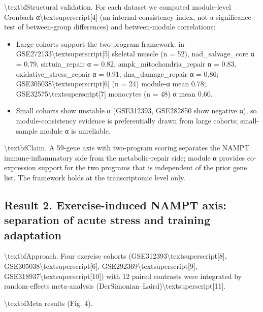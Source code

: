 \documentclass[11pt]{article}
\begin{document}
\textbackslash{}textbf{Structural validation.} For each dataset we computed module-level Cronbach α\textbackslash{}textsuperscript{[4]} (an internal-consistency index, not a significance test of between-group differences) and between-module correlations:

\begin{itemize}\setlength{\itemsep}{1pt}
\item Large cohorts support the two-program framework: in GSE272133\textbackslash{}textsuperscript{[5]} skeletal muscle (n = 52), nad\_salvage\_core α = 0.79, sirtuin\_repair α = 0.82, ampk\_mitochondria\_repair α = 0.83, oxidative\_stress\_repair α = 0.91, dna\_damage\_repair α = 0.86; GSE305038\textbackslash{}textsuperscript{[6]} (n = 24) module-α mean 0.78; GSE32575\textbackslash{}textsuperscript{[7]} monocytes (n = 48) α mean 0.60.
\item Small cohorts show unstable α (GSE312393, GSE282850 show negative α), so module-consistency evidence is preferentially drawn from large cohorts; small-sample module α is unreliable.
\end{itemize}
\textbackslash{}textbf{Claim.} A 59-gene axis with two-program scoring separates the NAMPT immune-inflammatory side from the metabolic-repair side; module α provides co-expression support for the two programs that is independent of the prior gene list. The framework holds at the transcriptomic level only.

\subsection*{Result 2. Exercise-induced NAMPT axis: separation of acute stress and training adaptation}
\textbackslash{}textbf{Approach.} Four exercise cohorts (GSE312393\textbackslash{}textsuperscript{[8]}, GSE305038\textbackslash{}textsuperscript{[6]}, GSE292369\textbackslash{}textsuperscript{[9]}, GSE318937\textbackslash{}textsuperscript{[10]}) with 12 paired contrasts were integrated by random-effects meta-analysis (DerSimonian–Laird)\textbackslash{}textsuperscript{[11]}.

\textbackslash{}textbf{Meta results (Fig. 4).}
\end{document}
